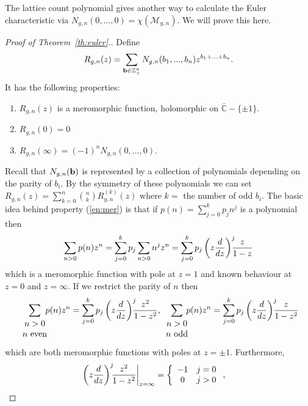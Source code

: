 \documentclass{amsart}
\newcommand{\bc}{\mathbb{C}}
\newcommand{\bz}{\mathbb{Z}}
\newcommand{\modm}{\mathcal{M}}
\begin{document}
The lattice count polynomial gives another way to calculate the Euler characteristic via $N_{g,n}(0,...,0)=\chi\left(\modm_{g,n}\right)$.  We will prove this here.
\begin{proof}[Proof of Theorem~\ref{th:euler}.]
Define
\[ R_{g,n}(z)=\sum_{{\bf b}\in\bz_+^n}N_{g,n}(b_1,...,b_n)z^{b_1+...+b_n}.\]
It has the following properties:
\begin{enumerate}
\item $R_{g,n}(z)$ is a meromorphic function, holomorphic on $\bar{\bc}-\{\pm 1\}$.  \label{en:mer}
\item $R_{g,n}(0)=0$  \label{en:zer}
\item $R_{g,n}(\infty)=(-1)^nN_{g,n}(0,...,0)$.   \label{en:inf}
\end{enumerate}
Recall that $N_{g,n}({\bf b})$ is represented by a collection of polynomials depending on the parity of $b_i$.  By the symmetry of these polynomials we can set $R_{g,n}(z)=\sum_{k=0}^n\binom{n}{k}R^{(k)}_{g,n}(z)$ where $k=$ the number of odd $b_i$.  The basic idea behind property (\ref{en:mer}) is that if $p(n)=\sum_{j=0}^kp_jn^j$ is a polynomial then
\[\sum_{n>0}p(n)z^n=\sum_{j=0}^kp_j\sum_{n>0}n^jz^n=\sum_{j=0}^kp_j\left(z\frac{d}{dz}\right)^j\hspace{-2mm}\frac{z}{1-z}\]
which is a meromorphic function with pole at $z=1$ and known behaviour at $z=0$ and $z=\infty$.  If we restrict the parity of $n$ then
\begin{equation}   \label{eq:mero}
\sum_{\begin{array}{c}n>0\\n{\rm\ even}\end{array}}\hspace{-3mm}p(n)z^n=\sum_{j=0}^kp_j\left(z\frac{d}{dz}\right)^j\hspace{-2mm}\frac{z^2}{1-z^2},\sum_{\begin{array}{c}n>0\\n{\rm\ odd}\end{array}}\hspace{-3mm}p(n)z^n=\sum_{j=0}^kp_j\left(z\frac{d}{dz}\right)^j\hspace{-2mm}\frac{z}{1-z^2}
\end{equation}
which are both meromorphic functions with poles at $z=\pm 1$.  Furthermore, 
\[ \left(z\frac{d}{dz}\right)^j\hspace{-2mm}\left.\frac{z^2}{1-z^2}\right|_{z=\infty}=\left\{\begin{array}{cl}-1&j=0\\0&j>0\end{array}\right.,\quad
\]
\end{proof}
\end{document}
